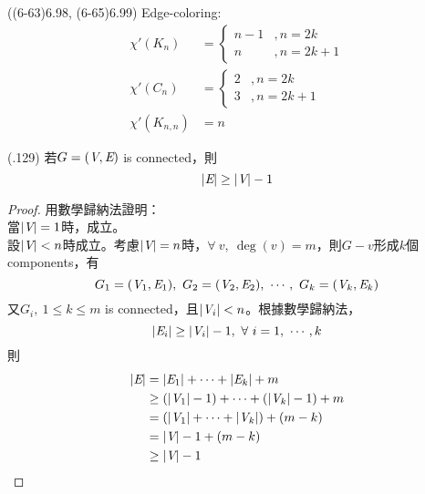 \item \begin{theorem}{((6-63)6.98, (6-65)6.99)} Edge-coloring: \begin{equation}
        \begin{aligned}
            \chi'(K_n) & = \begin{cases}
                n - 1 &, n = 2k \\
                n &, n = 2k + 1
            \end{cases} \\
            \chi'(C_n) & = \begin{cases}
                2 &, n = 2k \\
                3 &, n = 2k + 1
            \end{cases} \\
            \chi'(K_{n , n}) & = n
        \end{aligned}
    \end{equation}
\end{theorem}

\item \begin{theorem}{(.129)} 若$G = (\textit{V}, \textit{E})$ is connected，則\begin{equation}
        |\textit{E}| \ge |\textit{V}| - 1    
    \end{equation} \begin{proof}
        用數學歸納法證明： \\
        當$|\textit{V}| = 1$時，成立。 \\
        設$|\textit{V}| < n$時成立。考慮$|\textit{V}| = n$時，$\forall \ v, \ \deg(v) = m$，則$G - v$形成$k$個components，有\begin{equation}
            G_1 = (\V_1, \E_1), \ G_2 = (\V_2, \E_2), \ \cdots, \ G_k = (\V_k, \E_k)
        \end{equation} 又$G_i, \ 1 \le k \le m$ is connected，且$|\textit{V}_i| < n$。根據數學歸納法，\begin{equation}
            |\textit{E}_i| \ge |\textit{V}_i| - 1, \ \forall \ i = 1, \ \cdots, k
        \end{equation} 則 \begin{equation}
            \begin{aligned}
                |\textit{E}| & = |\textit{E}_1| + \cdots + |\textit{E}_k| + m \\
                & \ge (|\textit{V}_1| - 1) + \cdots + (|\textit{V}_k| - 1) + m \\
                & = (|\textit{V}_1| + \cdots + |\textit{V}_k|) + (m - k) \\
                & = |\textit{V}| - 1 + (m - k) \\
                & \ge |\textit{V}| - 1
            \end{aligned}
        \end{equation}
    \end{proof}
\end{theorem}
